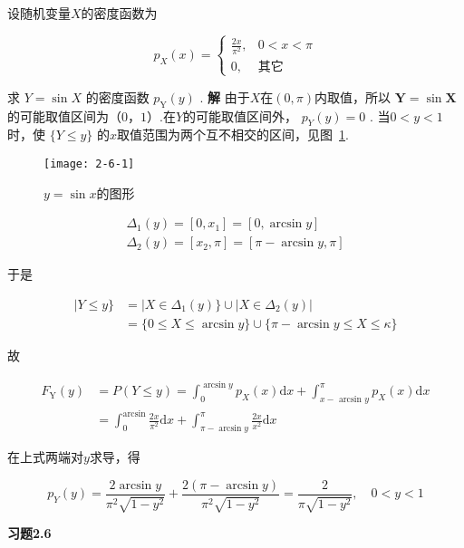 \begin{example}
	设随机变量$ X $的密度函数为
	
	\[
	p_{X}(x)=\left\{\begin{array}{ll}
	{\frac{2 x}{\pi^{2}},} & {0<x<\pi} \\ 
	{0,} & {\text{其它}}
	\end{array}\right.
	\]
	
	求 $Y=\sin X$ 的密度函数 $p_{\mathrm{Y}}(y)$ .
	\textbf{解} 由于$ X $在$ (0, \pi) $内取值，所以 $\mathbf{Y}=\sin \boldsymbol{X}$ 的可能取值区间为$ （0，1） $.在$ Y $的可能取值区间外， $p_{Y}(y)=0$ .
	当$ 0<y<1 $时，使 $\{ Y \leqslant y \}$ 的$ x $取值范围为两个互不相交的区间，见图~\ref{fig:2-6-1}.
	
	\begin{figure}
		\centering
		\texttt{[image: 2-6-1]}
		\caption{$y=\sin x$的图形}
		\label{fig:2-6-1}
	\end{figure}
	
	\[
	\begin{array}{l}{\Delta_{1}(y)=\left[0, x_{1}\right]=[0, \arcsin y]} \\ {\Delta_{2}(y)=\left[x_{2}, \pi\right]=[\pi-\arcsin y, \pi]}\end{array}
	\]
	
	于是
	
	\[
	\begin{aligned} | Y \leqslant y \} &=| X \in \Delta_{1}(y) \} \cup\left|X \in \Delta_{2}(y)\right| \\ &=\{0 \leqslant X \leqslant \arcsin y\} \cup\{\pi-\arcsin y \leqslant X \leqslant \kappa\} \end{aligned}
	\]
	
	故
	
	\[
	\begin{array}{ll}
	{F_{\mathrm{Y}}(y)} & {=P(Y \leqslant y)=\int_{0}^{\arcsin y} p_{X}(x) \mathrm{d} x+\int_{x-\text { arcsin } y}^{\pi} p_{X}(x) \mathrm{d} x} \\ 
	{} & {=\int_{0}^{\arcsin } \frac{2 x}{\pi^{2}} \mathrm{d} x+\int_{\pi-\arcsin y}^{\pi} \frac{2 x}{x^{2}} \mathrm{d} x}
	\end{array}
	\]
	
	在上式两端对$ y $求导，得
	
	\[
	p_{Y}(y)=\frac{2 \arcsin y}{\pi^{2} \sqrt{1-y^{2}}}+\frac{2(\pi-\arcsin y)}{\pi^{2} \sqrt{1-y^{2}}}=\frac{2}{\pi \sqrt{1-y^{2}}}, \quad 0<y<1
	\]
\end{example}

\begin{center}
	\textbf{习题2.6}
\end{center}

